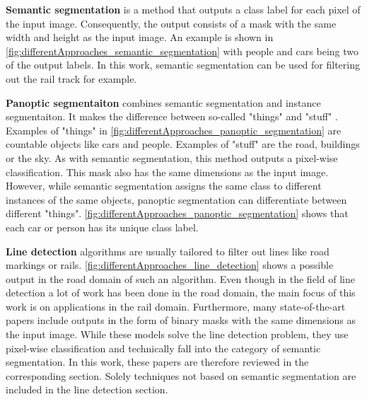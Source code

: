 \vspace{1cm} %

\noindent\textbf{Semantic segmentation} is a method that outputs a class label for each pixel of the input image.
Consequently, the output consists of a mask with the same width and height as the input image.
An example is shown in \autoref{fig:differentApproaches_semantic_segmentation} with people and cars being two of the output labels.
In this work, semantic segmentation can be used for filtering out the rail track for example.

\vspace{1cm} %

\noindent\textbf{Panoptic segmentaiton} combines semantic segmentation and instance segmentaiton.
It makes the difference between so-called "things" and "stuff" \cite{panopticsegmentation2019}.
Examples of "things" in \autoref{fig:differentApproaches_panoptic_segmentation} are countable objects like cars and people.
Examples of "stuff" are the road, buildings or the sky.
As with semantic segmentation, this method outputs a pixel-wise classification.
This mask also has the same dimensions as the input image.
However, while semantic segmentation assigns the same class to different instances of the same objects, panoptic segmentation can differentiate between different "things".
\autoref{fig:differentApproaches_panoptic_segmentation} shows that each car or person has its unique class label.

\vspace{1cm} %

\noindent\textbf{Line detection} algorithms are usually tailored to filter out lines like road markings or rails.
\autoref{fig:differentApproaches_line_detection} shows a possible output in the road domain of such an algorithm.
Even though in the field of line detection a lot of work has been done in the road domain, the main focus of this work is on applications in the rail domain.
Furthermore, many state-of-the-art papers include outputs in the form of binary masks with the same dimensions as the input image.
While these models solve the line detection problem, they use pixel-wise classification and technically fall into the category of semantic segmentation.
In this work, these papers are therefore reviewed in the corresponding section.
Solely techniques not based on semantic segmentation are included in the line detection section.

